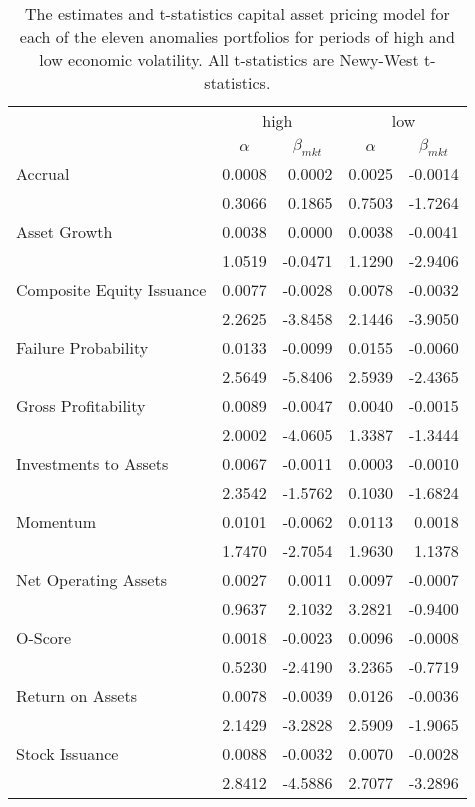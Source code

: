 
\begin{table}[]
    \caption{\newline The estimates and t-statistics capital asset pricing model for each of the eleven anomalies portfolios for periods of high and low economic volatility. All t-statistics are Newy-West t-statistics.}
    \label{tab:epu-capm}
    \begin{tabular}{@{}lrrrr@{}}
    \toprule
     & \multicolumn{2}{c}{high} & \multicolumn{2}{c}{low} \\ \cmidrule(l){2-5} 
     & \multicolumn{1}{c}{$\alpha$} & \multicolumn{1}{c}{$\beta_{mkt}$} & \multicolumn{1}{c}{$\alpha$} & \multicolumn{1}{c}{$\beta_{mkt}$} \\ \midrule
    Accrual & 0.0008 & 0.0002 & 0.0025 & -0.0014 \\
     & 0.3066 & 0.1865 & 0.7503 & -1.7264 \\
    Asset Growth & 0.0038 & 0.0000 & 0.0038 & -0.0041 \\
     & 1.0519 & -0.0471 & 1.1290 & -2.9406 \\
    Composite Equity Issuance & 0.0077 & -0.0028 & 0.0078 & -0.0032 \\
     & 2.2625 & -3.8458 & 2.1446 & -3.9050 \\
    Failure Probability & 0.0133 & -0.0099 & 0.0155 & -0.0060 \\
     & 2.5649 & -5.8406 & 2.5939 & -2.4365 \\
    Gross Profitability & 0.0089 & -0.0047 & 0.0040 & -0.0015 \\
     & 2.0002 & -4.0605 & 1.3387 & -1.3444 \\
    Investments to Assets & 0.0067 & -0.0011 & 0.0003 & -0.0010 \\
     & 2.3542 & -1.5762 & 0.1030 & -1.6824 \\
    Momentum & 0.0101 & -0.0062 & 0.0113 & 0.0018 \\
     & 1.7470 & -2.7054 & 1.9630 & 1.1378 \\
    Net Operating Assets & 0.0027 & 0.0011 & 0.0097 & -0.0007 \\
     & 0.9637 & 2.1032 & 3.2821 & -0.9400 \\
    O-Score & 0.0018 & -0.0023 & 0.0096 & -0.0008 \\
     & 0.5230 & -2.4190 & 3.2365 & -0.7719 \\
    Return on Assets & 0.0078 & -0.0039 & 0.0126 & -0.0036 \\
     & 2.1429 & -3.2828 & 2.5909 & -1.9065 \\
    Stock Issuance & 0.0088 & -0.0032 & 0.0070 & -0.0028 \\
     & 2.8412 & -4.5886 & 2.7077 & -3.2896 \\ \bottomrule
    \end{tabular}
    \end{table}

